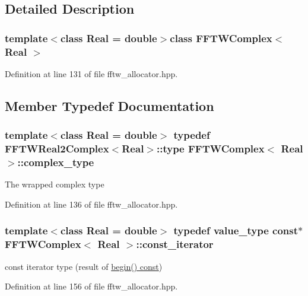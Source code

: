 \subsection{Detailed Description}
\subsubsection*{template$<$class Real = double$>$class F\-F\-T\-W\-Complex$<$ Real $>$}



Definition at line 131 of file fftw\-\_\-allocator.\-hpp.



\subsection{Member Typedef Documentation}
\hypertarget{class_f_f_t_w_complex_ad0e87dc783429ac362b464f0c561357b}{
\subsubsection[{complex\-\_\-type}]{\setlength{\rightskip}{0pt plus 5cm}template$<$class Real = double$>$ typedef {\bf F\-F\-T\-W\-Real2\-Complex}$<$Real$>$\-::{\bf type} {\bf F\-F\-T\-W\-Complex}$<$ Real $>$\-::{\bf complex\-\_\-type}}}\label{class_f_f_t_w_complex_ad0e87dc783429ac362b464f0c561357b}
The wrapped complex type 

Definition at line 136 of file fftw\-\_\-allocator.\-hpp.

\hypertarget{class_f_f_t_w_complex_ade8293628a3a66859ee87cd4cb783308}{
\subsubsection[{const\-\_\-iterator}]{\setlength{\rightskip}{0pt plus 5cm}template$<$class Real = double$>$ typedef {\bf value\-\_\-type} const$\ast$ {\bf F\-F\-T\-W\-Complex}$<$ Real $>$\-::{\bf const\-\_\-iterator}}}\label{class_f_f_t_w_complex_ade8293628a3a66859ee87cd4cb783308}
const iterator type (result of \hyperlink{class_f_f_t_w_complex_a3f0cff255651d6a8159bcec59900c553}{begin() const}) 

Definition at line 156 of file fftw\-\_\-allocator.\-hpp.

